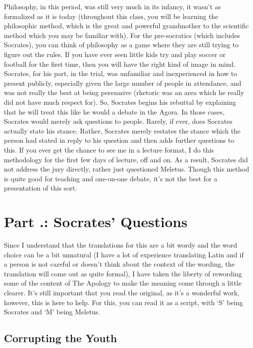 Philosophy, in this period, was still very much in its infancy, it wasn't as formalized as it is today (throughout this class, you will be learning the philosophic method, which is the great and powerful grandmother to the scientific method which you may be familiar with). For the pre-socratics (which includes Socrates), you can think of philosophy as a game where they are still trying to figure out the rules. If you have ever seen little kids try and play soccer or football for the first time, then you will have the right kind of image in mind.  Socrates, for his part, in the trial, was unfamiliar and inexperienced in how to present publicly, especially given the large number of people in attendance, and was not really the best at being persuasive (rhetoric was an area which he really did not have much respect for). So, Socrates begins his rebuttal by explaining that he will treat this like he would a debate in the Agora. In those cases, Socrates would merely ask questions to people. Rarely, if ever, does Socrates actually state his stance. Rather, Socrates merely restates the stance which the person had stated in reply to his question and then adds further questions to this. If you ever get the chance to see me in a lecture format, I do this methodology for the first few days of lecture, off and on. As a result, Socrates did not address the jury directly, rather just questioned Meletus. Though this method is quite good for teaching and one-on-one debate, it's not the best for a presentation of this sort. 
\section{Part \thechapcount.\theseccount: Socrates' Questions}

Since I understand that the translations for this are a bit wordy and the word choice can be a bit unnatural (I have a lot of experience translating Latin and if a person is not careful or doesn't think about the context of the wording, the translation will come out as quite formal), I have taken the liberty of rewording some of the content of The Apology to make the meaning come through a little clearer. It's still important that you read the original, as it's a wonderful work, however, this is here to help. For this, you can read it as a script, with `S' being Socrates and `M' being Meletus.
\subsection{Corrupting the Youth}

